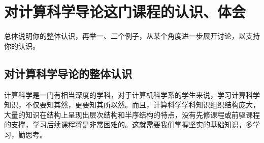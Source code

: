 \documentclass{article}
\begin{document}
\section{对计算科学导论这门课程的认识、体会}
总体说明你的整体认识，再举一、二个例子，从某个角度进一步展开讨论，以支持你的认识。\par

\subsection{对计算科学导论的整体认识}
计算科学是一门有相当深度的学科，对于计算机科学系的学生来说，学习计算科学知识，不仅要知其然，更要知其所以然。而且，计算科学学科知识组织结构庞大，大量的知识在结构上呈现出层次结构和半序结构的特点，没有先修课程或前驱课程的支撑，学习后续课程将是非常困难的。这就需要我们掌握坚实的基础知识，多学习，勤思考。\par
\end{document}
